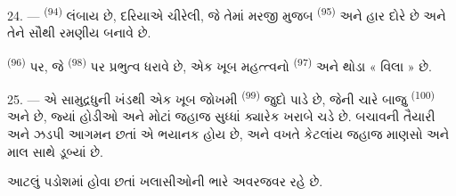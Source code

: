 \VUsaut{3.0mm}
\VUsaut{3.0mm}

24. ---  \textsuperscript{(94)} લંબાય છે, દરિયાએ ચીરેલી, જે
તેમાં મરજી મુજબ  \textsuperscript{(95)} અને
 હાર દોરે છે અને તેને સૌથી રમણીય બનાવે છે.

 \textsuperscript{(96)} પર, જે 
\textsuperscript{(98)} પર પ્રભુત્વ ધરાવે છે, એક ખૂબ મહત્ત્વનો
 \textsuperscript{(97)} અને થોડા « વિલા » છે.

25. --- એ સામુદ્રધુની ખંડથી એક ખૂબ જોખમી 
\textsuperscript{(99)} જુદો પાડે છે, જેની ચારે બાજુ  \textsuperscript{(100)} અને  છે, જ્યાં
હોડીઓ અને મોટાં જહાજ સુધ્ધાં ક્યારેક ખરાબે ચડે છે. બચાવની તૈયારી અને
 ઝડપી આગમન છતાં એ  ભયાનક હોય છે,
અને  વખતે કેટલાંય જહાજ માણસો અને માલ સાથે
ડૂબ્યાં છે.

આટલું પડોશમાં હોવા છતાં  ખલાસીઓની ભારે અવરજવર રહે છે.

\VUsaut{6.0mm}
\VUfilet{22mm}
